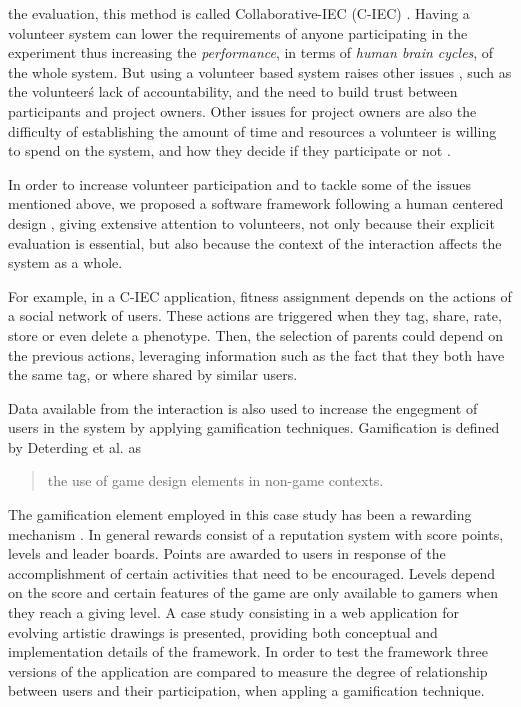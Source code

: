 the evaluation, this method is called Collaborative-IEC (C-IEC)
\cite{picbreeder,seyama2016development,wagy2014collective}.
Having a volunteer system can lower the requirements of anyone participating in
the experiment thus increasing the {\em performance}, in terms of 
{\em human brain cycles}, of the whole system. But using a volunteer based 
system raises other issues \cite{sarmenta2001volunteer,web:BOINC}, such as the 
volunteer\'s lack of accountability, and the need to build trust between participants and project
owners. Other issues for project owners are also the difficulty of establishing 
the amount of time and resources a volunteer is willing to spend on the system, 
and how they decide if they participate or not \cite{JJ:2016}. 

In order to increase volunteer participation and to tackle some of the issues mentioned above,  
we proposed a software framework following a human centered design \cite{greenhouse2012human},
giving extensive attention to volunteers, not only because their
explicit evaluation is essential, but also because the context of the 
interaction affects the system as a whole.

For example, in a C-IEC application, fitness assignment depends on the
actions of a social network of users.  These actions are triggered when 
they tag, share, rate, store or even delete a phenotype. 
Then, the selection of parents could depend on the previous actions, leveraging information 
such as the fact that they both have the same tag, or where shared by
similar users.

Data available from the interaction is also used to increase the engegment of 
users in the system by applying  gamification techniques. Gamification is defined by 
Deterding et al. \cite{deterding2011game} as
\begin{quote}
  the use of game design elements in non-game contexts.
\end{quote}  
The gamification element employed in this case study has been a rewarding mechanism  
\cite{dubois2013understanding}. In general rewards  consist of a reputation system 
with score points, levels and leader boards. Points are awarded to users in response of 
the accomplishment of certain activities that need to be encouraged. Levels depend
on the score and certain features of the game are only available to gamers when 
they reach a giving level. %
A case study consisting in a web application for evolving artistic drawings
is presented, providing both conceptual and implementation details of the framework. 
In order to test the framework three versions of the application are compared to
measure the degree of relationship between users and their participation,
when appling a gamification technique. 

